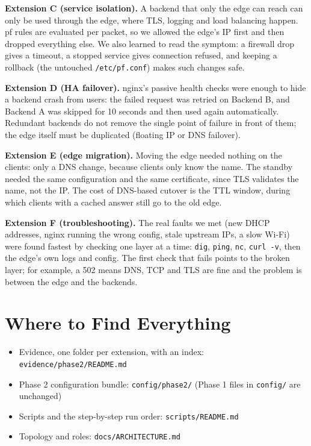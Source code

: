 \documentclass[11pt,a4paper]{article}
\begin{document}
\textbf{Extension C (service isolation).} A backend that only the edge can reach can only be used
through the edge, where TLS, logging and load balancing happen. pf rules are evaluated per packet, so
we allowed the edge's IP first and then dropped everything else. We also learned to read the symptom:
a firewall drop gives a timeout, a stopped service gives connection refused, and keeping a rollback
(the untouched \texttt{/etc/pf.conf}) makes such changes safe.

\textbf{Extension D (HA failover).} nginx's passive health checks were enough to hide a backend crash
from users: the failed request was retried on Backend B, and Backend A was skipped for 10 seconds and
then used again automatically. Redundant backends do not remove the single point of failure in front
of them; the edge itself must be duplicated (floating IP or DNS failover).

\textbf{Extension E (edge migration).} Moving the edge needed nothing on the clients: only a DNS
change, because clients only know the name. The standby needed the same configuration and the same
certificate, since TLS validates the name, not the IP. The cost of DNS-based cutover is the TTL
window, during which clients with a cached answer still go to the old edge.

\textbf{Extension F (troubleshooting).} The real faults we met (new DHCP addresses, nginx running the
wrong config, stale upstream IPs, a slow Wi-Fi) were found fastest by checking one layer at a time:
\texttt{dig}, \texttt{ping}, \texttt{nc}, \texttt{curl -v}, then the edge's own logs and config. The
first check that fails points to the broken layer; for example, a 502 means DNS, TCP and TLS are fine
and the problem is between the edge and the backends.

\section{Where to Find Everything}
\begin{itemize}
\item Evidence, one folder per extension, with an index: \texttt{evidence/phase2/README.md}
\item Phase 2 configuration bundle: \texttt{config/phase2/} (Phase 1 files in \texttt{config/} are unchanged)
\item Scripts and the step-by-step run order: \texttt{scripts/README.md}
\item Topology and roles: \texttt{docs/ARCHITECTURE.md}
\end{itemize}
\end{document}
